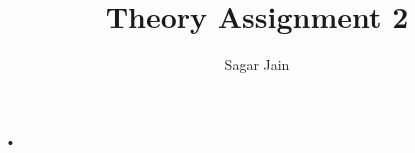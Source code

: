 \documentclass[10pt,a4paper]{report}
\author{Sagar Jain}
\title{Theory Assignment 2}
\begin{document}
•
\end{document}

